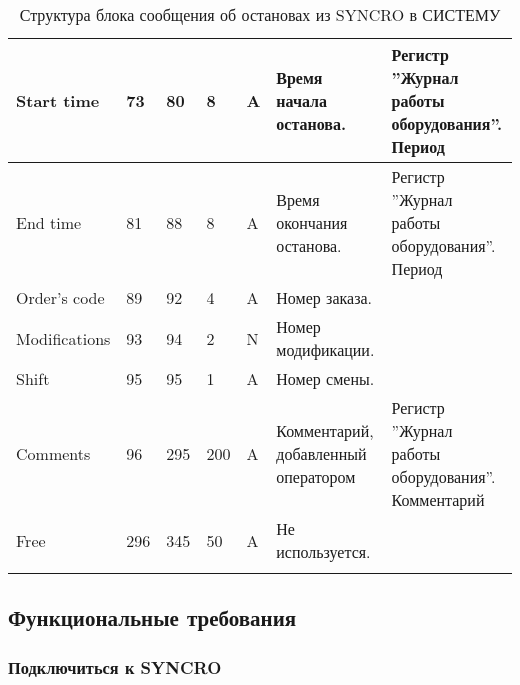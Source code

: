 \begin{landscape}
\begin{longtable}{|p{45mm}|p{6mm}|p{6mm}|p{8mm}|p{6mm}|p{70mm}|p{80mm}|}
\hline
\parbox[c][10mm]{45mm}{Start time} & \parbox{9mm}{73} & \parbox{9mm}{80} & \parbox{11mm}{8} & \parbox{10mm}{A} & \parbox{70mm}{Время начала останова.} & \parbox{80mm}{Регистр ''Журнал работы оборудования''. Период} \\
\hline
\parbox[c][10mm]{45mm}{End time} & \parbox{9mm}{81} & \parbox{9mm}{88} & \parbox{11mm}{8} & \parbox{10mm}{A} & \parbox{70mm}{Время окончания останова.} & \parbox{80mm}{Регистр ''Журнал работы оборудования''. Период} \\
\hline
\parbox[c][10mm]{45mm}{Order’s code} & \parbox{9mm}{89} & \parbox{9mm}{92} & \parbox{11mm}{4} & \parbox{10mm}{A} & \parbox{70mm}{Номер заказа.} & \parbox{80mm}{} \\
\hline
\parbox[c][10mm]{45mm}{Modifications} & \parbox{9mm}{93} & \parbox{9mm}{94} & \parbox{11mm}{2} & \parbox{10mm}{N} & \parbox{70mm}{Номер модификации.} & \parbox{80mm}{} \\
\hline
\parbox[c][10mm]{45mm}{Shift} & \parbox{9mm}{95} & \parbox{9mm}{95} & \parbox{11mm}{1} & \parbox{10mm}{A} & \parbox{70mm}{Номер смены.} & \parbox{80mm}{} \\
\hline
\parbox[c][10mm]{45mm}{Comments} & \parbox{9mm}{96} & \parbox{9mm}{295} & \parbox{11mm}{200} & \parbox{10mm}{A} & \parbox{70mm}{Комментарий, добавленный оператором} & \parbox{80mm}{Регистр ''Журнал работы оборудования''. Комментарий} \\
\hline
\parbox[c][10mm]{45mm}{Free} & \parbox{9mm}{296} & \parbox{9mm}{345} & \parbox{11mm}{50} & \parbox{10mm}{A} & \parbox{70mm}{Не используется.} & \parbox{80mm}{} \\
\hline

\caption{Структура блока сообщения об остановах из SYNCRO в СИСТЕМУ}\label{tab:fosber_stoppage}
\end{longtable}  
\normalsize

\end{landscape} 
\normalsize


\subsection{Функциональные требования}

\subsubsection{Подключиться к SYNCRO}


